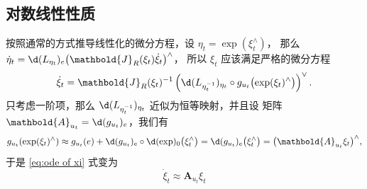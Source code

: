 \documentclass[fontset=none,zihao=-4]{Notes}
\newcommand{\mat}[1]{\mathbold{#1}}
\begin{document}
\subsection{对数线性性质}

按照通常的方式推导线性化的微分方程，设 $\eta_t=\exp(\xi_t^\wedge)$，
那么 $\dot\eta_t=\d (L_{\eta_t})_e\bigl(\mat J_R(\xi_t)\dot\xi_t\bigr)^\wedge$，
所以 $\xi_t$ 应该满足严格的微分方程
\begin{equation}\label{eq:ode of xi}
  \dot\xi_t=\mat J_R(\xi_t)^{-1}
  \left(\d (L_{\eta_t^{-1}})_{\eta_t}\circ 
  g_{u_t}\bigl(\exp(\xi_t)^\wedge\bigr)\right)^\vee.
\end{equation}
只考虑一阶项，那么 $\d (L_{\eta_t^{-1}})_{\eta_t}$ 近似为恒等映射，并且设
矩阵 $\mat A_{u_t}=\d (g_{u_t})_e$，我们有
\[
  g_{u_t}(\exp(\xi_t)^\wedge)\approx g_{u_t}(e)+\d (g_{u_t})_e\circ \d (\exp)_0\bigl(\xi_t^\wedge\bigr)
  =\d (g_{u_t})_e\bigl(\xi_t^\wedge\bigr)=\bigl(\mat A_{u_t}\xi_t\bigr)^\wedge,
\]
于是 \eqref{eq:ode of xi} 式变为
\begin{equation}
  \dot\xi_t\approx \mat A_{u_t}\xi_t
\end{equation}
\end{document}
